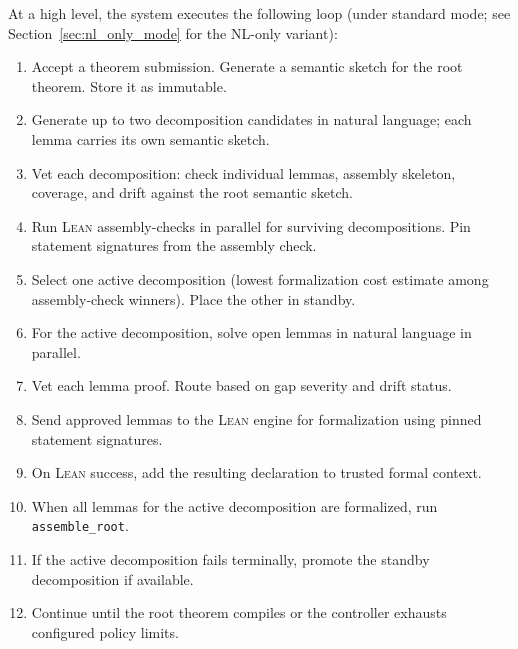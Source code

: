 \documentclass[11pt,a4paper]{article}
\newcommand{\Lean}{\textsc{Lean}}
\begin{document}
At a high level, the system executes the following loop (under standard mode; see Section~\ref{sec:nl_only_mode} for the NL-only variant):

\begin{enumerate}[leftmargin=2em]
  \item Accept a theorem submission. Generate a semantic sketch for the root theorem. Store it as immutable.
  \item Generate up to two decomposition candidates in natural language; each lemma carries its own semantic sketch.
  \item Vet each decomposition: check individual lemmas, assembly skeleton, coverage, and drift against the root semantic sketch.
  \item Run \Lean{} assembly-checks in parallel for surviving decompositions. Pin statement signatures from the assembly check.
  \item Select one active decomposition (lowest formalization cost estimate among assembly-check winners). Place the other in standby.
  \item For the active decomposition, solve open lemmas in natural language in parallel.
  \item Vet each lemma proof. Route based on gap severity and drift status.
  \item Send approved lemmas to the \Lean{} engine for formalization using pinned statement signatures.
  \item On \Lean{} success, add the resulting declaration to trusted formal context.
  \item When all lemmas for the active decomposition are formalized, run \texttt{assemble\_root}.
  \item If the active decomposition fails terminally, promote the standby decomposition if available.
  \item Continue until the root theorem compiles or the controller exhausts configured policy limits.
\end{enumerate}
\end{document}

